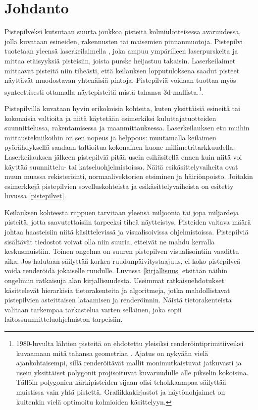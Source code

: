 \section{Johdanto}

Pistepilveksi kutsutaan suurta joukkoa pisteitä kolmiulotteisessa avaruudessa, jolla kuvataan esineiden, rakennusten tai maisemien pinnanmuotoja. Pistepilvi tuotetaan yleensä laserkeilaimella , joka ampuu ympärilleen laserpurskeita ja mittaa etäisyyksiä pisteisiin, joista purske heijastuu takaisin. Laserkeilaimet mittaavat pisteitä niin tiheästi, että keilauksen lopputuloksena saadut pisteet näyttävät muodostavan yhtenäisiä pintoja. Pistepilviä voidaan tuottaa myös synteettisesti ottamalla näytepisteitä mistä tahansa 3d-mallista.\footnote{1980-luvulta lähtien pisteitä on ehdotettu yleisiksi renderöintiprimitiiveiksi kuvaamaan mitä tahansa geometriaa \cite{Whitted}. Ajatus on nykyään vielä ajankohtaisempi, sillä renderöitävät mallit monimutkaistuvat jatkuvasti ja usein yksittäiset polygonit projisoituvat kuvaruudulle alle pikselin kokoisina. Tällöin polygonien kärkipisteiden sijaan olisi tehokkaampaa säilyttää muistissa vain yhtä pistettä. Grafiikkakirjastot ja näytönohjaimet on kuitenkin vielä optimoitu kolmioiden käsittelyyn.}.

Pistepilvillä kuvataan hyvin erikokoisia kohteita, kuten yksittäisiä esineitä tai kokonaisia valtioita ja niitä käytetään esimerkiksi kuluttajatuotteiden suunnittelussa, rakentamisessa ja maanmittauksessa. Laserkeilauksen etu muihin mittaustekniikoihin on sen nopeus ja helppous: muutamalla keilaimen pyörähdyksellä saadaan taltioitua kokonainen huone millimetritarkkuudella. Laserkeilauksen jälkeen pistepilviä pitää usein esikäsitellä ennen kuin niitä voi käyttää suunnittelu- tai katseluohjelmistoissa. Näitä esikäsittelyvaiheita ovat muun muassa rekisteröinti, normaalivektorien etsiminen ja häiriönpoisto. Joitakin esimerkkejä pistepilvien sovelluskohteista ja esikäsittelyvaiheista on esitetty luvussa \ref{pistepilvet}.

Keilauksen kohteesta riippuen tarvitaan yleensä miljoonia tai jopa miljardeja pisteitä, jotta saavutettaisiin tarpeeksi tiheä näytteistys. Pisteiden valtava määrä johtaa haasteisiin niitä käsittelevissä ja visualisoivissa ohjelmistoissa. Pistepilviä sisältävät tiedostot voivat olla niin suuria, etteivät ne mahdu kerralla keskusmuistiin. Toinen ongelma on suuren pistepilven visualisointiin vaadittu aika. Jos halutaan säilyttää korkea ruudunpäivitystaajuus, ei koko pistepilveä voida renderöidä jokaiselle ruudulle. Luvussa \ref{kirjallisuus} etsitään näihin ongelmiin ratkaisuja alan kirjallisuudesta. Useimmat ratkaisuehdotukset käsittelevät hierarkisia tietorakenteita ja algoritmeja, jotka mahdollistavat pistepilvien asteittaisen lataamisen ja renderöinnin. Näistä tietorakenteista valitaan tarkempaa tarkastelua varten sellainen, joka sopii laitossuunnitteluohjelmiston tarpeisiin. 

